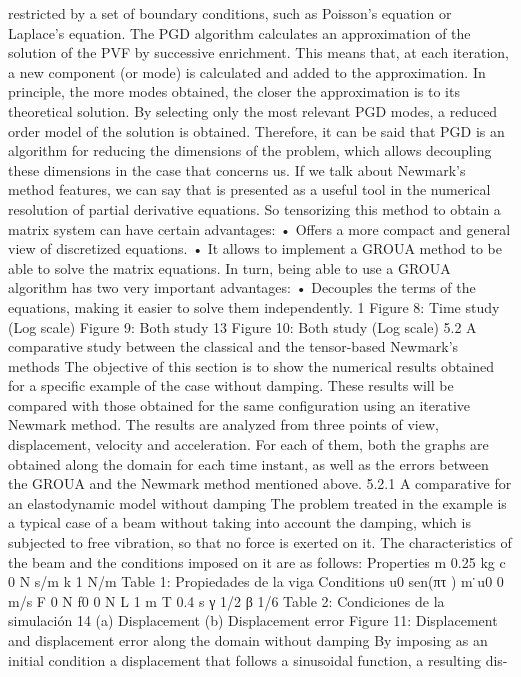 \documentclass[a4paper, 10pt]{article}
\begin{document}
restricted by a set of boundary conditions, such as Poisson’s equation or Laplace’s equation.
The PGD algorithm calculates an approximation of the solution of the PVF by successive enrichment.
This means that, at each iteration, a new component (or mode) is calculated and added to the approximation.
In principle, the more modes obtained, the closer the approximation is to its theoretical solution.
By selecting only the most relevant PGD modes, a reduced order model of the solution is obtained.
Therefore, it can be said that PGD is an algorithm for reducing the dimensions of the problem, which allows
decoupling these dimensions in the case that concerns us.
If we talk about Newmark’s method features, we can say that is presented as a useful tool in the numerical
resolution of partial derivative equations. So tensorizing this method to obtain a matrix system can have
certain advantages:
• Offers a more compact and general view of discretized equations.
• It allows to implement a GROUA method to be able to solve the matrix equations.
In turn, being able to use a GROUA algorithm has two very important advantages:
• Decouples the terms of the equations, making it easier to solve them independently.
1
Figure 8: Time study (Log scale)
Figure 9: Both study
13
Figure 10: Both study (Log scale)
5.2 A comparative study between the classical and the tensor-based Newmark’s
methods
The objective of this section is to show the numerical results obtained for a specific example of the case
without damping. These results will be compared with those obtained for the same configuration using an
iterative Newmark method. The results are analyzed from three points of view, displacement, velocity and
acceleration. For each of them, both the graphs are obtained along the domain for each time instant, as well
as the errors between the GROUA and the Newmark method mentioned above.
5.2.1 A comparative for an elastodynamic model without damping
The problem treated in the example is a typical case of a beam without taking into account the damping,
which is subjected to free vibration, so that no force is exerted on it. The characteristics of the beam and
the conditions imposed on it are as follows:
Properties
m 0.25 kg
c 0 N s/m
k 1 N/m
Table 1: Propiedades de la viga
Conditions
u0 sen(πτ ) m
 ̇u0 0 m/s
F 0 N
f0 0 N
L 1 m
T 0.4 s
γ 1/2
β 1/6
Table 2: Condiciones de la simulación
14
(a) Displacement (b) Displacement error
Figure 11: Displacement and displacement error along the domain without damping
By imposing as an initial condition a displacement that follows a sinusoidal function, a resulting dis-
\end{document}
